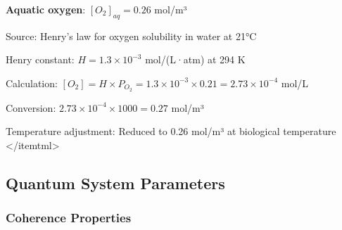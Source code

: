 \textbf{Aquatic oxygen}: $[O_2]_{aq} = 0.26$ mol/m³
\begin{itemtml}
\item Source: Henry's law for oxygen solubility in water at 21°C
\item Henry constant: $H = 1.3 \times 10^{-3}$ mol/(L·atm) at 294 K
\item Calculation: $[O_2] = H \times P_{O_2} = 1.3 \times 10^{-3} \times 0.21 = 2.73 \times 10^{-4}$ mol/L
\item Conversion: $2.73 \times 10^{-4} \times 1000 = 0.27$ mol/m³
\item Temperature adjustment: Reduced to 0.26 mol/m³ at biological temperature
</itemtml>

\subsection{Quantum System Parameters}

\subsubsection{Coherence Properties}


\end{itemtml}
